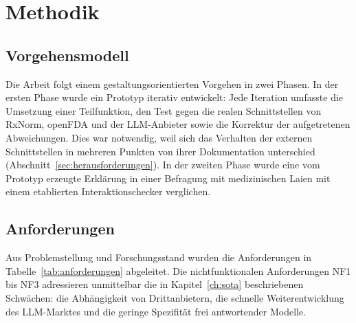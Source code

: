 \chapter{Methodik}
\label{ch:methodik}

\section{Vorgehensmodell}

Die Arbeit folgt einem gestaltungsorientierten Vorgehen in zwei Phasen. In der ersten Phase wurde ein Prototyp iterativ entwickelt: Jede Iteration umfasste die Umsetzung einer Teilfunktion, den Test gegen die realen Schnittstellen von RxNorm, openFDA und der LLM-Anbieter sowie die Korrektur der aufgetretenen Abweichungen. Dies war notwendig, weil sich das Verhalten der externen Schnittstellen in mehreren Punkten von ihrer Dokumentation unterschied (Abschnitt~\ref{sec:herausforderungen}). In der zweiten Phase wurde eine vom Prototyp erzeugte Erklärung in einer Befragung mit medizinischen Laien mit einem etablierten Interaktionschecker verglichen.

\section{Anforderungen}

Aus Problemstellung und Forschungsstand wurden die Anforderungen in Tabelle~\ref{tab:anforderungen} abgeleitet. Die nichtfunktionalen Anforderungen NF1 bis NF3 adressieren unmittelbar die in Kapitel~\ref{ch:sota} beschriebenen Schwächen: die Abhängigkeit von Drittanbietern, die schnelle Weiterentwicklung des LLM-Marktes und die geringe Spezifität frei antwortender Modelle.

